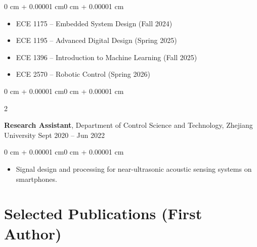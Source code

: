 \documentclass[10pt, letterpaper]{article}
\newenvironment{highlights}{
    \begin{itemize}[
        topsep=0.10 cm,
        parsep=0.10 cm,
        partopsep=0pt,
        itemsep=0pt,
        leftmargin=0 cm + 10pt
    ]
}{
    \end{itemize}
}
\newenvironment{onecolentry}{
    \begin{adjustwidth}{0 cm + 0.00001 cm}{0 cm + 0.00001 cm}
}{
    \end{adjustwidth}
}
\newenvironment{twocolentry}[2][]{
    \onecolentry
    \def\secondColumn{#2}
    \setcolumnwidth{\fill, 4.5 cm}
    \begin{paracol}{2}
}{
    \switchcolumn \raggedleft \secondColumn
    \end{paracol}
    \endonecolentry
}
\begin{document}
        \vspace{0.10 cm}
        \begin{onecolentry}
            \begin{highlights}
                \item ECE 1175 -- Embedded System Design (Fall 2024)
                \item ECE 1195 -- Advanced Digital Design (Spring 2025)
                \item ECE 1396 -- Introduction to Machine Learning (Fall 2025)
                \item ECE 2570 -- Robotic Control (Spring 2026)
            \end{highlights}
        \end{onecolentry}

        \vspace{0.2 cm}

        \begin{twocolentry}{
            Sept 2020 -- Jun 2022
        }
            \textbf{Research Assistant}, Department of Control Science and Technology, Zhejiang University\end{twocolentry}

        \vspace{0.10 cm}
        \begin{onecolentry}
            \begin{highlights}
                \item Signal design and processing for near-ultrasonic acoustic sensing systems on smartphones.
            \end{highlights}
        \end{onecolentry}


    \section{Selected Publications (First Author)}
\end{document}
